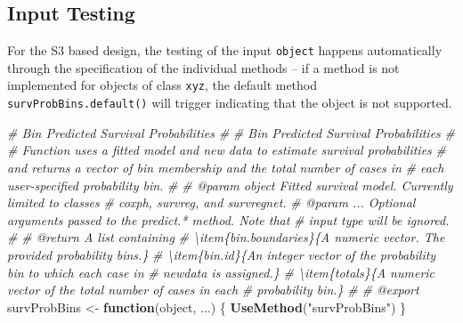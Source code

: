 \documentclass[
]{book}
\newenvironment{Shaded}{\begin{snugshade}}{\end{snugshade}}
\newcommand{\CommentTok}[1]{\textcolor[rgb]{0.56,0.35,0.01}{\textit{#1}}}
\newcommand{\ControlFlowTok}[1]{\textcolor[rgb]{0.13,0.29,0.53}{\textbf{#1}}}
\newcommand{\FunctionTok}[1]{\textcolor[rgb]{0.13,0.29,0.53}{\textbf{#1}}}
\newcommand{\NormalTok}[1]{#1}
\newcommand{\OtherTok}[1]{\textcolor[rgb]{0.56,0.35,0.01}{#1}}
\newcommand{\StringTok}[1]{\textcolor[rgb]{0.31,0.60,0.02}{#1}}
\begin{document}
\hypertarget{input-testing-1}{%
\subsection{Input Testing}\label{input-testing-1}}

For the S3 based design, the testing of the input \texttt{object} happens automatically through the specification of the individual methods -- if a method is not implemented for objects of class \texttt{xyz}, the default method \texttt{survProbBins.default()} will trigger indicating that the object is not supported.

\begin{Shaded}
\begin{Highlighting}[]
\CommentTok{\#\textquotesingle{} Bin Predicted Survival Probabilities}
\CommentTok{\#\textquotesingle{} }
\CommentTok{\#\textquotesingle{} Bin Predicted Survival Probabilities}
\CommentTok{\#\textquotesingle{} }
\CommentTok{\#\textquotesingle{} Function uses a fitted model and new data to estimate survival probabilities}
\CommentTok{\#\textquotesingle{}   and returns a vector of bin membership and the total number of cases in}
\CommentTok{\#\textquotesingle{}   each user{-}specified probability bin.}
\CommentTok{\#\textquotesingle{}   }
\CommentTok{\#\textquotesingle{} @param object Fitted survival model. Currently limited to classes}
\CommentTok{\#\textquotesingle{}   \textasciigrave{}coxph\textasciigrave{}, \textasciigrave{}survreg\textasciigrave{}, and \textasciigrave{}survregnet\textasciigrave{}.}
\CommentTok{\#\textquotesingle{} @param ... Optional arguments passed to the \textasciigrave{}predict.*\textasciigrave{} method. Note that}
\CommentTok{\#\textquotesingle{}   input \textasciigrave{}type\textasciigrave{} will be ignored.}
\CommentTok{\#\textquotesingle{} }
\CommentTok{\#\textquotesingle{} @return A list containing}
\CommentTok{\#\textquotesingle{} \textbackslash{}item\{bin.boundaries\}\{A numeric vector. The provided probability bins.\}}
\CommentTok{\#\textquotesingle{} \textbackslash{}item\{bin.id\}\{An integer vector of the probability bin to which each case in }
\CommentTok{\#\textquotesingle{}   \textasciigrave{}newdata\textasciigrave{} is assigned.\}}
\CommentTok{\#\textquotesingle{} \textbackslash{}item\{totals\}\{A numeric vector of the total number of cases in each }
\CommentTok{\#\textquotesingle{}   probability bin.\}}
\CommentTok{\#\textquotesingle{} }
\CommentTok{\#\textquotesingle{} @export}
\NormalTok{survProbBins }\OtherTok{\textless{}{-}} \ControlFlowTok{function}\NormalTok{(object, ...) \{ }\FunctionTok{UseMethod}\NormalTok{(}\StringTok{"survProbBins"}\NormalTok{) \}}


\end{Highlighting}
\end{Shaded}
\end{document}
